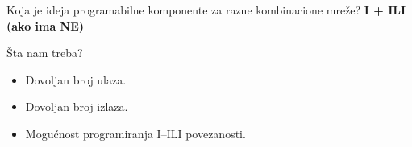 \begin{frame}[label=07-s004]
Koja je ideja programabilne komponente za razne kombinacione mreže?
\vspace{4mm}
\vspace{3mm}
\centering\textbf{I + ILI (ako ima NE)}\par
\vspace{4mm}\raggedright
Šta nam treba?
\begin{itemize}
\item Dovoljan broj ulaza.
\item Dovoljan broj izlaza.
\item Mogućnost programiranja I–ILI povezanosti.
\end{itemize}
\end{frame}
